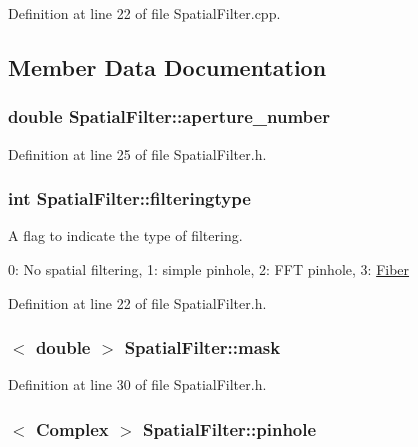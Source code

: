 Definition at line 22 of file SpatialFilter.cpp.



\subsection{Member Data Documentation}
\hypertarget{classSpatialFilter_a30dc6502152a5e08bef6b216fe3f039e}{
\subsubsection[{aperture\_\-number}]{\setlength{\rightskip}{0pt plus 5cm}double {\bf SpatialFilter::aperture\_\-number}}}
\label{classSpatialFilter_a30dc6502152a5e08bef6b216fe3f039e}


Definition at line 25 of file SpatialFilter.h.

\hypertarget{classSpatialFilter_a6f4926fc2561191946f284986d611a60}{
\subsubsection[{filteringtype}]{\setlength{\rightskip}{0pt plus 5cm}int {\bf SpatialFilter::filteringtype}}}
\label{classSpatialFilter_a6f4926fc2561191946f284986d611a60}


A flag to indicate the type of filtering. 

0: No spatial filtering, 1: simple pinhole, 2: FFT pinhole, 3: \hyperlink{classFiber}{Fiber} 

Definition at line 22 of file SpatialFilter.h.

\hypertarget{classSpatialFilter_afdd9b350fdcade39ee57d676eae3996f}{
\subsubsection[{mask}]{$<$ double $>$ {\bf SpatialFilter::mask}}}
\label{classSpatialFilter_afdd9b350fdcade39ee57d676eae3996f}


Definition at line 30 of file SpatialFilter.h.

\hypertarget{classSpatialFilter_acb2a9b5b26d41de1d543708f35c0c0b0}{
\subsubsection[{pinhole}]{$<$ {\bf Complex} $>$ {\bf SpatialFilter::pinhole}}}
\label{classSpatialFilter_acb2a9b5b26d41de1d543708f35c0c0b0}



